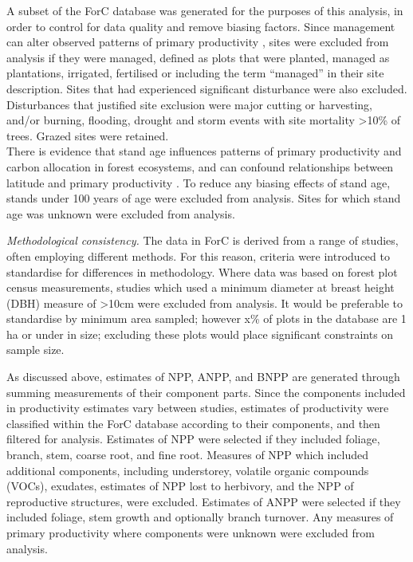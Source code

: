 \documentclass[]{article}
\begin{document}
A subset of the ForC database was generated for the purposes of this
analysis, in order to control for data quality and remove biasing
factors. Since management can alter observed patterns of primary
productivity \citep{simova_enigma_2017}, sites were excluded from
analysis if they were managed, defined as plots that were planted,
managed as plantations, irrigated, fertilised or including the term
``managed'' in their site description. Sites that had experienced
significant disturbance were also excluded. Disturbances that justified
site exclusion were major cutting or harvesting, and/or burning,
flooding, drought and storm events with site mortality
\textgreater{}10\% of trees. Grazed sites were retained.\\
There is evidence that stand age influences patterns of primary
productivity and carbon allocation in forest ecosystems, and can
confound relationships between latitude and primary productivity
\citep{de_lucia_forest_2007, gillman_latitude_2015}. To reduce any
biasing effects of stand age, stands under 100 years of age were
excluded from analysis. Sites for which stand age was unknown were
excluded from analysis.

\emph{Methodological consistency.} The data in ForC is derived from a
range of studies, often employing different methods. For this reason,
criteria were introduced to standardise for differences in methodology.
Where data was based on forest plot census measurements, studies which
used a minimum diameter at breast height (DBH) measure of
\textgreater{}10cm were excluded from analysis. It would be preferable
to standardise by minimum area sampled; however x\% of plots in the
database are 1 ha or under in size; excluding these plots would place
significant constraints on sample size.

As discussed above, estimates of NPP, ANPP, and BNPP are generated
through summing measurements of their component parts. Since the
components included in productivity estimates vary between studies,
estimates of productivity were classified within the ForC database
according to their components, and then filtered for analysis. Estimates
of NPP were selected if they included foliage, branch, stem, coarse
root, and fine root. Measures of NPP which included additional
components, including understorey, volatile organic compounds (VOCs),
exudates, estimates of NPP lost to herbivory, and the NPP of
reproductive structures, were excluded. Estimates of ANPP were selected
if they included foliage, stem growth and optionally branch turnover.
Any measures of primary productivity where components were unknown were
excluded from analysis.
\end{document}
